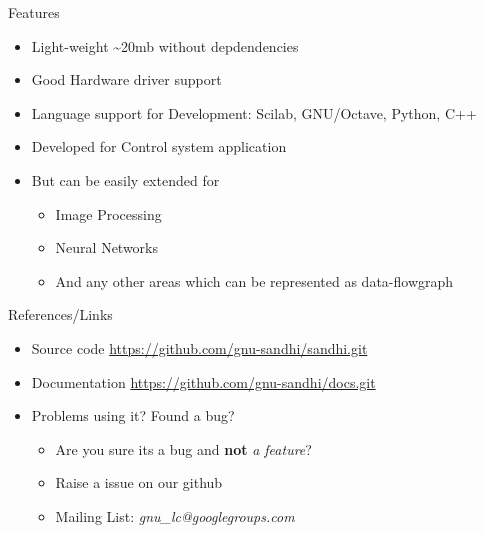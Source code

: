 \documentclass{beamer}
\begin{document}
\begin{frame}{Features}

\begin{itemize}
  \item Light-weight \textasciitilde 20mb without depdendencies
  \item Good Hardware driver support
  \item Language support for Development: Scilab, GNU/Octave, Python, C++
  \item Developed for Control system application
  \item But can be easily extended for
  \begin{itemize}
  	\item Image Processing
	\item Neural Networks
	\item And any other areas which can be represented as data-flowgraph
  \end{itemize}
\end{itemize}
\vskip 1cm
\end{frame}

\begin{frame}{References/Links}

\begin{itemize}
  \item Source code \url{https://github.com/gnu-sandhi/sandhi.git}
  \item Documentation \url{https://github.com/gnu-sandhi/docs.git}
  \item Problems using it? Found a bug?
  \begin{itemize}
 	\item Are you sure its a bug and \textbf{not} \textit{a feature}?
	\item Raise a issue on our github
	\item Mailing List: \textit{gnu\_lc@googlegroups.com}
  \end{itemize}
\end{itemize}

\vskip 1cm

\end{frame}
\end{document}
